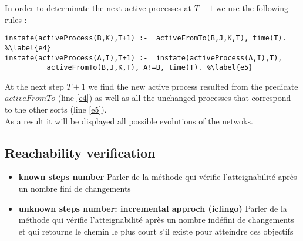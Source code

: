 In order to determinate the next active processes at $T+1$ we use the following rules :
\begin{lstlisting}
instate(activeProcess(B,K),T+1) :-  activeFromTo(B,J,K,T), time(T). %\label{e4}
instate(activeProcess(A,I),T+1) :-  instate(activeProcess(A,I),T),
          activeFromTo(B,J,K,T), A!=B, time(T). %\label{e5}
\end{lstlisting}

At the next step $T+1$ we find the new active process resulted from the predicate $activeFromTo$ (line \ref{e4}) as well as all the unchanged processes that correspond to the other sorts (line \ref{e5}).\\
As a result it will be displayed all possible evolutions of the netwoks.
\subsection{Reachability verification}
\begin{itemize}


\item \textbf{known steps number } 
Parler de la méthode qui vérifie l'atteignabilité après un nombre fini de changements
\item \textbf{unknown steps number: incremental approch (iclingo)}
Parler de la méthode qui vérifie l'atteignabilité après un nombre indéfini de changements et qui retourne le chemin le plus court s'il existe pour atteindre ces objectifs
\end{itemize}